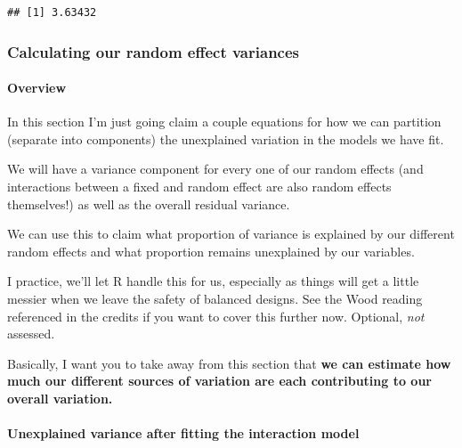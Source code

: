 \documentclass[
  openany]{book}
\newenvironment{Shaded}{\begin{snugshade}}{\end{snugshade}}
\newcommand{\CommentTok}[1]{\textcolor[rgb]{0.56,0.35,0.01}{\textit{#1}}}
\newcommand{\FunctionTok}[1]{\textcolor[rgb]{0.00,0.00,0.00}{#1}}
\newcommand{\NormalTok}[1]{#1}
\newcommand{\SpecialCharTok}[1]{\textcolor[rgb]{0.00,0.00,0.00}{#1}}
\begin{document}
\begin{Shaded}
\end{Shaded}

\begin{verbatim}
## [1] 3.63432
\end{verbatim}

\hypertarget{calculating-our-random-effect-variances}{%
\subsubsection{Calculating our random effect variances}\label{calculating-our-random-effect-variances}}

\hypertarget{overview}{%
\paragraph{Overview}\label{overview}}

In this section I'm just going claim a couple equations for how we can partition (separate into components) the unexplained variation in the models we have fit.

We will have a variance component for every one of our random effects (and interactions between a fixed and random effect are also random effects themselves!) as well as the overall residual variance.

We can use this to claim what proportion of variance is explained by our different random effects and what proportion remains unexplained by our variables.

I practice, we'll let R handle this for us, especially as things will get a little messier when we leave the safety of balanced designs. See the Wood reading referenced in the credits if you want to cover this further now. Optional, \emph{not} assessed.

Basically, I want you to take away from this section that \textbf{we can estimate how much our different sources of variation are each contributing to our overall variation.}

\hypertarget{unexplained-variance-after-fitting-the-interaction-model}{%
\paragraph{Unexplained variance after fitting the interaction model}\label{unexplained-variance-after-fitting-the-interaction-model}}
\end{document}
